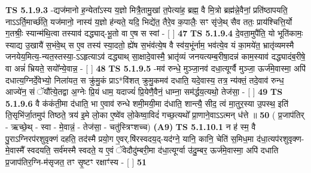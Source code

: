 \documentclass[17pt]{extarticle}
\begin{document}
                  \newline
                                \textbf{ TS 5.1.9.3} \newline
                  -द्यज॑मानो ह॒न्येता᳚ऽस्य य॒ज्ञो मित्रै॒तामु॒खां त॒पेत्या॑ह॒ ब्रह्म॒ वै मि॒त्रो ब्रह्म॑न्ने॒वैनां॒ प्रति॑ष्ठापयति॒ नाऽऽर्ति॒मार्च्छ॑ति॒ यज॑मानो॒ नास्य॑ य॒ज्ञो ह॑न्यते॒ यदि॒ भिद्ये॑त॒ तैरे॒व क॒पालैः॒ सꣳ सृ॑जे॒थ् सैव ततः॒ प्राय॑श्चित्ति॒र्यो ग॒तश्रीः॒ स्यान्म॑थि॒त्वा तस्याव॑ दद्ध्याद्-भू॒तो वा ए॒ष स स्वां - [  ] \textbf{  47} \newline
                  \newline
                                \textbf{ TS 5.1.9.4} \newline
                  दे॒वता॒मुपै॑ति॒ यो भूति॑कामः॒ स्याद्य उ॒खायै॑ स॒भंवे॒थ् स ए॒व तस्य॑ स्या॒दतो॒ ह्ये॑ष स॒भंव॑त्ये॒ष वै स्व॑य॒भूंर्नाम॒ भव॑त्ये॒व यं का॒मये॑त॒ भ्रातृ॑व्यमस्मै जनयेय॒मित्य॒-न्यत॒स्तस्या॒-ऽऽहृत्याऽव॑ दद्ध्याथ् सा॒क्षादे॒वास्मै॒ भ्रातृ॑व्यं जनयत्यम्ब॒रीषा॒दन्न॑ काम॒स्याव॑ दद्ध्यादंब॒रीषे॒ वा अन्नं॑ भ्रियते॒ सयो᳚न्ये॒वान्न॒ - [  ] \textbf{  48} \newline
                  \newline
                                \textbf{ TS 5.1.9.5} \newline
                  -मव॑ रुन्धे॒ मुञ्जा॒नव॑ दधा॒त्यूर्ग्वै मुञ्जा॒ ऊर्ज॑मे॒वास्मा॒ अपि॑ दधात्य॒ग्निर्दे॒वेभ्यो॒ निला॑यत॒ स क्रु॑मु॒कं प्राऽ*वि॑शत् क्रुमु॒कमव॑ दधाति॒ यदे॒वास्य॒ तत्र॒ न्य॑क्तं॒ तदे॒वाव॑ रुन्ध॒ आज्ये॑न॒ सं ॅयौ᳚त्ये॒तद्वा अ॒ग्नेः प्रि॒यं धाम॒ यदाज्यं॑ प्रि॒येणै॒वैनं॒ धाम्ना॒ सम॑र्द्धय॒त्यथो॒ तेज॑सा॒ - [  ] \textbf{  49} \newline
                  \newline
                                \textbf{ TS 5.1.9.6} \newline
                  वै क॑कंती॒मा द॑धाति॒ भा ए॒वाव॑ रुन्धे शमी॒मयी॒मा द॑धाति॒ शान्त्यै॒ सीद॒ त्वं मा॒तुर॒स्या उ॒पस्थ॒ इति॑ ति॒सृभि॑र्जा॒तमुप॑ तिष्ठते॒ त्रय॑ इ॒मे लो॒का ए॒ष्वे॑व लो॒केष्वा॒विदं॑ गच्छ॒त्यथो᳚ प्रा॒णाने॒वाऽऽत्मन् ध॑त्ते ॥ \textbf{  50} \newline
                  \newline
                      ( प्र॒जाप॑तिर् - ऋच्छे॒थ् - स्वा - मे॒वान्नं॒ - तेज॑सा॒ - चतु॑स्त्रिꣳशच्च)  \textbf{(A9)} \newline \newline
                                        \textbf{ TS 5.1.10.1} \newline
                  न ह॑ स्म॒ वै पु॒राऽग्निरप॑रशुवृक्णं दहति॒ तद॑स्मै प्रयो॒ग ए॒वर्.षि॑रस्वदय॒द्-यद॑ग्ने॒ यानि॒ कानि॒ चेति॑ स॒मिध॒मा द॑धा॒त्यप॑रशुवृक्ण-मे॒वास्मै᳚ स्वदयति॒ सर्व॑मस्मै स्वदते॒ य ए॒वं ॅवेदौदु॑म्बरी॒मा द॑धा॒त्यूर्ग्वा उ॑दु॒म्बर॒ ऊर्ज॑मे॒वास्मा॒ अपि॑ दधाति प्र॒जाप॑तिर॒ग्नि-म॑सृजत॒ तꣳ सृ॒ष्टꣳ रक्षाꣳ॑स्य - [  ] \textbf{  51} \newline
\end{document}
